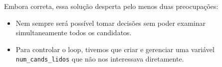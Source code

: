 \documentclass[11pt,a4paper]{article}
\providecommand{\tightlist}{%
      \setlength{\itemsep}{0pt}\setlength{\parskip}{0pt}}
\begin{document}
    Embora correta, essa solução desperta pelo menos duas preocupações:

\begin{itemize}
\tightlist
\item
  Nem sempre será possível tomar decisões sem poder examinar
  simultaneamente todos os candidatos.
\item
  Para controlar o loop, tivemos que criar e gerenciar uma variável
  \texttt{num\_cands\_lidos} que não nos interessava diretamente.
\end{itemize}


    
    
    
    
\end{document}
